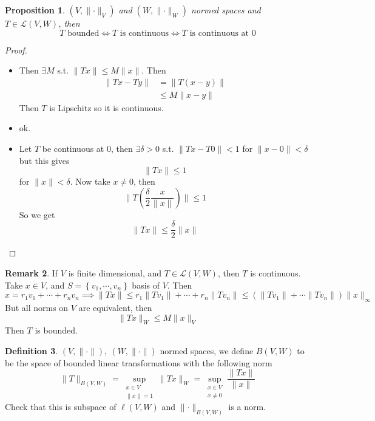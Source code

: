 \documentclass[11pt,a4paper]{article}
\theoremstyle{definition}
\newtheorem{definition}{Definition}[section]
\newtheorem{remark}[definition]{Remark}
\theoremstyle{plain}
\newtheorem{proposition}[definition]{Proposition}
\theoremstyle{remark}
\renewcommand{\set}[1]{\left\{ #1 \right\}}
\newcommand{\norm}[1]{\lVert #1 \rVert}
\newcommand{\1}{\mathbbm{1}}
\begin{document}
\begin{proposition}
    $(V, \norm{\cdot}_V)$ and $(W, \norm{\cdot}_W)$ normed spaces and $T \in \mathcal{L}(V,W)$, then 
    $$ T \text{ bounded} \iff  T \text{ is continuous} \iff T \text{ is continuous at } 0$$
\end{proposition}

\begin{proof}
    \begin{itemize}
        \item[$(i) \implies (ii)$] Then $\exists M$ s.t. $\norm{Tx} \le M \norm{x}$. Then 
        \begin{align*}
            \norm{Tx - Ty} &= \norm{T(x-y)} \\
            &\le M \norm{x-y}
        \end{align*}
        Then $T$ is Lipschitz so it is continuous. 

        \item[$(ii) \implies (iii)$] ok.
        
        \item[$(iii) \implies (i)$] Let $T$ be continuous at $0$, then $\exists \delta > 0$ s.t. $\norm{Tx - T0} < 1$ for $\norm{x - 0} < \delta$ but this gives 
        $$\norm{Tx} \le 1$$
        for $\norm{x} < \delta$. Now take $x \ne 0$, then 
        $$\norm{T \left(\frac{\delta}{2}\frac{x}{\norm{x}}\right)} \le 1$$
        So we get 
        $$\norm{Tx} \le \frac{\delta}{2} \norm{x}$$
    \end{itemize}
\end{proof}

\begin{remark}
    If $V$ is finite dimensional, and $T \in \mathcal{L}(V,W)$, then $T$ is continuous. Take $x \in V$, and $S = \set{v_1, \cdots, v_n}$ basis of $V$. Then 
    $$x = r_1 v_1 + \cdots + r_n v_n \implies \norm{Tx} \le r_1 \norm{Tv_1} + \cdots + r_n \norm{Tv_n} \le (\norm{Tv_1} + \cdots \norm{Tv_n}) \norm{x}_\infty$$
    But all norms on $V$ are equivalent, then 
    $$\norm{Tx}_W \le M \norm{x}_V$$
    Then $T$ is bounded.  
\end{remark}

\begin{definition}
    $(V, \norm{\cdot}), \ (W, \norm{\cdot})$ normed spaces, we define $B(V,W)$ to be the space of bounded linear transformations with the following norm
    $$\norm{T}_{B(V,W)} = \sup_{\substack{x \in V \\ \norm{x} = 1}} \norm{Tx}_W = \sup_{\substack{x \in V \\ x \ne 0}} \frac{\norm{Tx}}{\norm{x}}$$
    Check that this is subspace of $\ell(V, W)$ and $\norm{\cdot}_{B(V,W)}$ is a norm.
\end{definition}
\end{document}
